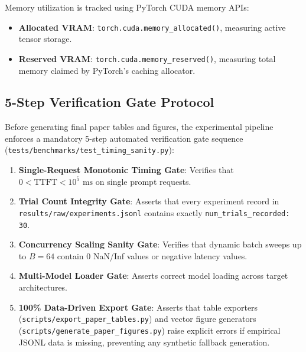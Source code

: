 Memory utilization is tracked using PyTorch CUDA memory APIs:
\begin{itemize}
    \item \textbf{Allocated VRAM}: \texttt{torch.cuda.memory\_allocated()}, measuring active tensor storage.
    \item \textbf{Reserved VRAM}: \texttt{torch.cuda.memory\_reserved()}, measuring total memory claimed by PyTorch's caching allocator.
\end{itemize}

\subsection{5-Step Verification Gate Protocol}
\label{sec:meth_verification_gates}

Before generating final paper tables and figures, the experimental pipeline enforces a mandatory 5-step automated verification gate sequence (\texttt{tests/benchmarks/test\_timing\_sanity.py}):
\begin{enumerate}
    \item \textbf{Single-Request Monotonic Timing Gate}: Verifies that $0 < \text{TTFT} < 10^5\text{ ms}$ on single prompt requests.
    \item \textbf{Trial Count Integrity Gate}: Asserts that every experiment record in \texttt{results/raw/experiments.jsonl} contains exactly \texttt{num\_trials\_recorded: 30}.
    \item \textbf{Concurrency Scaling Sanity Gate}: Verifies that dynamic batch sweeps up to $B=64$ contain 0 NaN/Inf values or negative latency values.
    \item \textbf{Multi-Model Loader Gate}: Asserts correct model loading across target architectures.
    \item \textbf{100\% Data-Driven Export Gate}: Asserts that table exporters (\texttt{scripts/export\_paper\_tables.py}) and vector figure generators (\texttt{scripts/generate\_paper\_figures.py}) raise explicit errors if empirical JSONL data is missing, preventing any synthetic fallback generation.
\end{enumerate}
